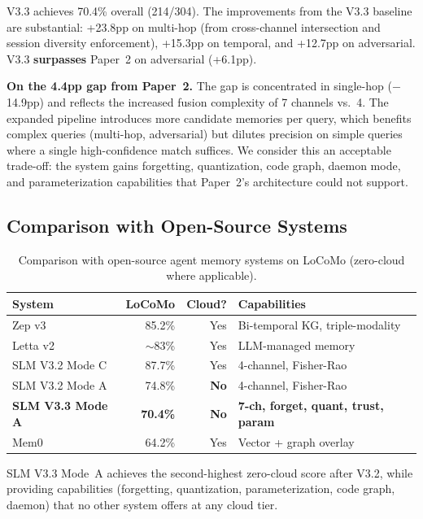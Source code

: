 V3.3 achieves 70.4\% overall (214/304). The improvements from the V3.3 baseline are substantial: +23.8pp on multi-hop (from cross-channel intersection and session diversity enforcement), +15.3pp on temporal, and +12.7pp on adversarial. V3.3 \textbf{surpasses} Paper~2 on adversarial (+6.1pp).

\textbf{On the 4.4pp gap from Paper~2.} The gap is concentrated in single-hop ($-$14.9pp) and reflects the increased fusion complexity of 7 channels vs.\ 4. The expanded pipeline introduces more candidate memories per query, which benefits complex queries (multi-hop, adversarial) but dilutes precision on simple queries where a single high-confidence match suffices. We consider this an acceptable trade-off: the system gains forgetting, quantization, code graph, daemon mode, and parameterization capabilities that Paper~2's architecture could not support.

\subsection{Comparison with Open-Source Systems}

\begin{table}[h]
\centering
\caption{Comparison with open-source agent memory systems on LoCoMo (zero-cloud where applicable).}
\small
\begin{tabular}{lrrp{4cm}}
\toprule
\textbf{System} & \textbf{LoCoMo} & \textbf{Cloud?} & \textbf{Capabilities} \\
\midrule
Zep v3 & 85.2\% & Yes & Bi-temporal KG, triple-modality \\
Letta v2 & $\sim$83\% & Yes & LLM-managed memory \\
SLM V3.2 Mode C & 87.7\% & Yes & 4-channel, Fisher-Rao \\
SLM V3.2 Mode A & 74.8\% & \textbf{No} & 4-channel, Fisher-Rao \\
\textbf{SLM V3.3 Mode A} & \textbf{70.4\%} & \textbf{No} & \textbf{7-ch, forget, quant, trust, param} \\
Mem0 & 64.2\% & Yes & Vector + graph overlay \\
\bottomrule
\end{tabular}
\end{table}

SLM V3.3 Mode~A achieves the second-highest zero-cloud score after V3.2, while providing capabilities (forgetting, quantization, parameterization, code graph, daemon) that no other system offers at any cloud tier.

